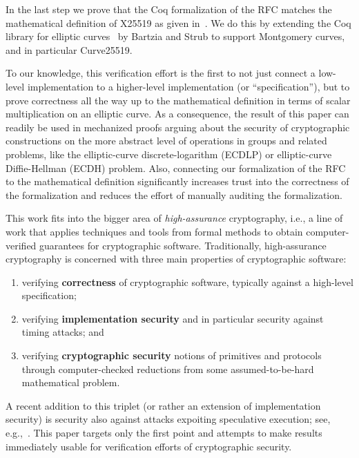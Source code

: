 In the last step we prove that the Coq formalization of the RFC matches
the mathematical definition of X25519 as given in~\cite[Sec.~2]{Ber06}.
We do this by extending the Coq library
for elliptic curves~\cite{BartziaS14} by Bartzia and Strub to
support Montgomery curves, and in particular Curve25519.

To our knowledge, this verification effort is the first to not just
connect a low-level implementation to a higher-level implementation (or ``specification''),
but to prove correctness all the way up
to the mathematical definition in terms of scalar multiplication on an elliptic curve.
As a consequence, the result of this paper can readily be used in mechanized proofs
arguing about the security of cryptographic constructions on the more abstract
level of operations in groups and related problems, like the elliptic-curve
discrete-logarithm (ECDLP) or elliptic-curve Diffie-Hellman (ECDH) problem.
Also, connecting our formalization of the RFC to the mathematical definition
significantly increases trust into the correctness of the formalization and
reduces the effort of manually auditing the formalization.

This work fits into the bigger area of \emph{high-assurance} cryptography,
i.e., a line of work that applies techniques and tools from formal methods 
to obtain computer-verified guarantees for cryptographic software. 
Traditionally, high-assurance cryptography is concerned with three main properties
of cryptographic software:
\begin{enumerate}
  \item verifying \textbf{correctness} of cryptographic software, 
    typically against a high-level specification;\label{hacs:correct}
  \item verifying \textbf{implementation security} and in particular
    security against timing attacks; and\label{hacs:sca}
  \item verifying \textbf{cryptographic security} notions of primitives and protocols 
    through computer-checked reductions from some assumed-to-be-hard mathematical problem.\label{hacs:secure}
\end{enumerate}
A recent addition to this triplet (or rather an extension of implementation security)
is security also against attacks expoiting speculative execution;
see, e.g.,~\cite{DBLP:conf/pldi/CauligiDGTSRB20}.
This paper targets only the first point and attempts to make results
immediately usable for verification efforts of cryptographic security.

